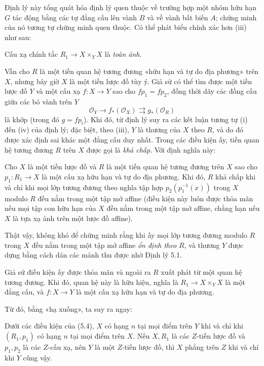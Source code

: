 Định lý này tổng quát hóa định lý quen thuộc về trường hợp một nhóm hữu hạn
$G$ tác động bằng các tự đẳng cấu lên vành $B$ và về vành bất biến $A$; chứng
minh của nó tương tự chứng minh quen thuộc. Có thể phát biểu chính xác hơn
(iii) như sau:

 Cấu xạ chính tắc
$R_1\to X\times_Y X$ là \emph{toàn ánh}.

Vẫn cho $R$ là một tiền quan hệ tương đương «hữu hạn và tự do địa phương»
trên $X$, nhưng bây giờ $X$ là một tiền lược đồ tùy ý. Giả sử có thể tìm được
một tiền lược đồ $Y$ và một cấu xạ $f:X\to Y$ sao cho $fp_1=fp_2$, đồng thời
dãy các đồng cấu giữa các bó vành trên $Y$
\[
  \mathcal O_Y\longrightarrow f_*(\mathcal O_X)
  \rightrightarrows g_*(\mathcal O_R)
\]
là khớp (trong đó $g=fp_i$). Khi đó, từ định lý suy ra các kết luận tương tự
(i) đến (iv) của định lý; đặc biệt, theo (iii), $Y$ là thương của $X$ theo
$R$, và do đó được xác định sai khác một đẳng cấu duy nhất. Trong các điều
kiện ấy, tiền quan hệ tương đương $R$ trên $X$ được gọi là \emph{khả chấp}.
Với định nghĩa này:

 Cho $X$ là một tiền lược đồ và $R$ là một tiền quan hệ
tương đương trên $X$ sao cho $p_1:R_1\to X$ là một cấu xạ hữu hạn và tự do địa
phương. Khi đó, $R$ khả chấp khi và chỉ khi mọi lớp tương đương theo nghĩa tập
hợp $p_2(p_1^{-1}(x))$ trong $X$ modulo $R$ đều nằm trong một tập mở affine
(điều kiện này luôn được thỏa mãn nếu mọi tập con hữu hạn của $X$ đều nằm
trong một tập mở affine, chẳng hạn nếu $X$ là tựa xạ ảnh trên một lược đồ
affine).

Thật vậy, không khó để chứng minh rằng khi ấy mọi lớp tương đương modulo $R$
trong $X$ đều nằm trong một tập mở affine \emph{ổn định theo $R$}, và thương
$Y$ được dựng bằng cách dán các mảnh thu được nhờ Định lý 5.1.

 Giả sử điều kiện ấy được thỏa mãn và ngoài ra $R$ xuất
phát từ một quan hệ tương đương. Khi đó, quan hệ này là hữu hiệu, nghĩa là
$R_1\to X\times_Y X$ là một đẳng cấu, và $f:X\to Y$ là một cấu xạ hữu hạn và
tự do địa phương.

Từ đó, bằng «hạ xuống», ta suy ra ngay:

 Dưới các điều kiện của (5.4), $X$ có hạng $n$ tại mọi
điểm trên $Y$ khi và chỉ khi $(R_1,p_1)$ có hạng $n$ tại mọi điểm trên $X$.
Nếu $X,R_1$ là các $Z$-tiền lược đồ và $p_1,p_2$ là các $Z$-cấu xạ, nên $Y$
là một $Z$-tiền lược đồ, thì $X$ phẳng trên $Z$ khi và chỉ khi $Y$ cũng vậy.


